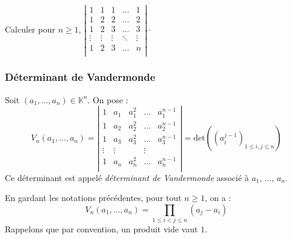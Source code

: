 \documentclass[a4paper,10pt]{report}
\begin{document}
\begin{ex}
\vspace{9cm}
\end{ex}


\begin{exa} 
Calculer pour $n \geq 1$, $\left\vert \begin{array}{ccccc}
1 & 1 & 1 & \ldots & 1 \\
1 & 2 & 2 & \ldots & 2 \\
1 & 2 & 3 & \ldots & 3 \\
\vdots & \vdots & \vdots & \ddots & \vdots \\
1 & 2 & 3 & \ldots & n \\
\end{array} \right\vert \cdot$
\end{exa}

\subsubsection{Déterminant de Vandermonde}

\begin{defin} Soit $(a_1, \ldots, a_n) \in \mathbb{K}^n$. On pose :
$$ V_n(a_1, \ldots, a_n) = \left\vert \begin{array}{ccccc}
1 & a_1 & a_1^2 & \ldots & a_1^{n-1} \\
1 & a_2 & a_2^2 & \ldots & a_2^{n-1} \\
1 & a_3 & a_3^2 & \ldots & a_3^{n-1} \\
\vdots & \vdots & & \vdots \\
1 & a_n & a_n^2 & \ldots & a_n^{n-1} \\
\end{array}\right\vert = \textrm{det}( (a_i^{j-1})_{1 \leq i,j \leq n})$$
Ce déterminant est appelé \textit{déterminant de Vandermonde} associé à $a_1$, $\ldots$, $a_n$.
\end{defin}

\begin{prop} En gardant les notations précédentes, pour tout $n \geq 1$, on a :
$$ V_n(a_1, \ldots, a_n) = \prod_{1 \leq i<j \leq n} (a_j-a_i) $$
Rappelons que par convention, un produit vide vaut $1$.
\end{prop}
\end{document}
